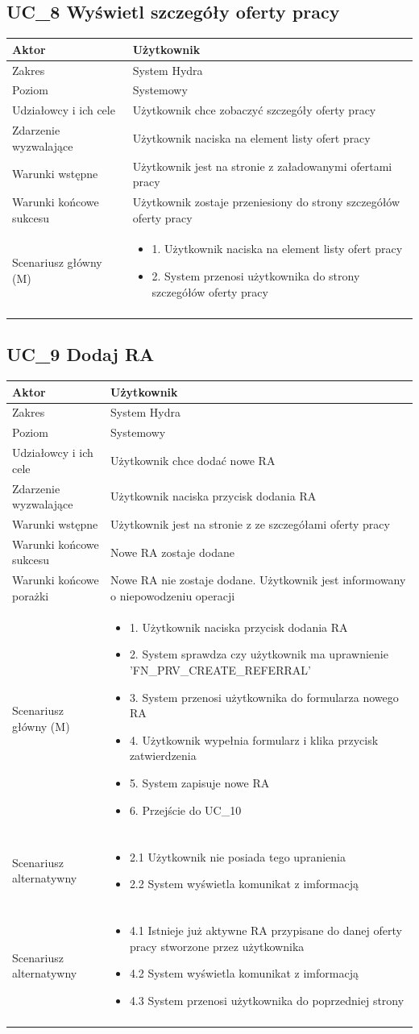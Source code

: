 \documentclass[oneside]{scrreprt}
\newcommand\addheading[2]{#1 &#2\\ \hline}
\newcommand\tabularhead{\begin{center} \begin{tabular}{lp{8cm}}
		\hline
	}
\newcommand\addmulrow[2]{ \begin{minipage}[t][][t]{6cm}#1\end{minipage}%
		&\begin{minipage}[t][][t]{8cm}
			\begin{itemize} #2 \newline \end{itemize}
		\end{minipage}\\ \\  \hline}
\newenvironment{usecase}{\tabularhead}
	{\hline\end{tabular} \end{center}}
\begin{document}
\subsection{UC\_8 Wyświetl szczegóły oferty pracy}
\begin{usecase}
	\addheading{Aktor}{Użytkownik} 
	\addheading{Zakres}{System Hydra}
	\addheading{Poziom}{Systemowy}
	\addheading{Udziałowcy i ich cele}{Użytkownik chce zobaczyć szczegóły oferty pracy}
	\addheading{Zdarzenie wyzwalające}{Użytkownik naciska na element listy ofert pracy}
	\addheading{Warunki wstępne}{Użytkownik jest na stronie z załadowanymi ofertami pracy}
	\addheading{Warunki końcowe sukcesu}{Użytkownik zostaje przeniesiony do strony szczegółów oferty pracy}
	\addmulrow{Scenariusz główny (M)}{
		\item[] 1. Użytkownik naciska na element listy ofert pracy
		\item[] 2. System przenosi użytkownika do strony szczegółów oferty pracy
	}
\end{usecase}

\subsection{UC\_9 Dodaj RA}
\begin{usecase}
	\addheading{Aktor}{Użytkownik} 
	\addheading{Zakres}{System Hydra}
	\addheading{Poziom}{Systemowy}
	\addheading{Udziałowcy i ich cele}{Użytkownik chce dodać nowe RA}
	\addheading{Zdarzenie wyzwalające}{Użytkownik naciska przycisk dodania RA}
	\addheading{Warunki wstępne}{Użytkownik jest na stronie z ze szczegółami oferty pracy}
	\addheading{Warunki końcowe sukcesu}{Nowe RA zostaje dodane}
	\addheading{Warunki końcowe porażki}{Nowe RA nie zostaje dodane. Użytkownik jest informowany o niepowodzeniu operacji}
	\addmulrow{Scenariusz główny (M)}{
		\item[] 1. Użytkownik naciska przycisk dodania RA
		\item[] 2. System sprawdza czy użytkownik ma uprawnienie 'FN\_PRV\_CREATE\_REFERRAL'
		\item[] 3. System przenosi użytkownika do formularza nowego RA
		\item[] 4. Użytkownik wypełnia formularz i klika przycisk zatwierdzenia
		\item[] 5. System zapisuje nowe RA
		\item[] 6. Przejście do UC\_10
	}
	\addmulrow{Scenariusz alternatywny}{
		\item[] 2.1 Użytkownik nie posiada tego upranienia
		\item[] 2.2 System wyświetla komunikat z imformacją
	}
	\addmulrow{Scenariusz alternatywny}{
		\item[] 4.1 Istnieje już aktywne RA przypisane do danej oferty pracy stworzone przez użytkownika
		\item[] 4.2 System wyświetla komunikat z imformacją
		\item[] 4.3 System przenosi użytkownika do poprzedniej strony
	}
\end{usecase}
\end{document}
